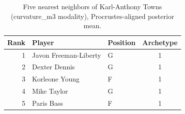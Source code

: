 \begin{table}[htbp]
  \centering\small
  \begin{tabular}{rllc}
    \toprule
    Rank & Player & Position & Archetype \\
    \midrule
    1 & Javon Freeman-Liberty & G & 1 \\
    2 & Dexter Dennis & G & 1 \\
    3 & Korleone Young & F & 1 \\
    4 & Mike Taylor & G & 1 \\
    5 & Paris Bass & F & 1 \\
    \bottomrule
  \end{tabular}
  \caption{Five nearest neighbors of Karl-Anthony Towns (curvature_m3 modality), Procrustes-aligned posterior mean.}
  \label{tab:Karl_Anthony_Towns_neighbors_curvature_m3}
\end{table}

